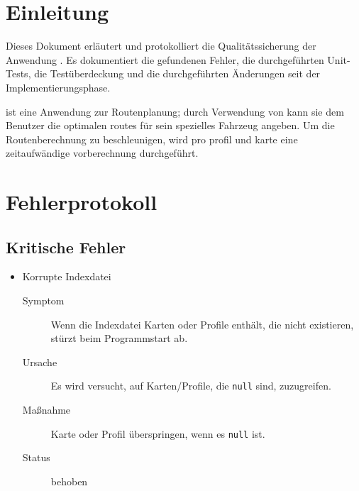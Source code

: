 \documentclass[a4paper, 11pt]{article}
\makeatletter
\def\namedlabel#1#2{\begingroup
    #2%
    \def\@currentlabel{#2}%
    \phantomsection\label{#1}\endgroup
}
\newcommand{\oitem}[2]{
  \@ifundefined{c@oitem#1}{\newcounter{oitem#1}}{} %
  \addtocounter{oitem#1}{10}
  \item[\namedlabel{#1:#2}{/#1\arabic{oitem#1}/}]
}
\newcommand{\bug}[6]{%
  \oitem{BG}{#1}
  	#2
    \begin{description}
    \item[Symptom] #3
    \item[Ursache] #4
    \item[Maßnahme] #5
    \item[Status] #6
    \end{description}
}
\newcommand{\code}[1]{\texttt{#1}}
\makeatother
\begin{document}
\section{Einleitung}
Dieses Dokument erläutert und protokolliert die Qualitätssicherung der Anwendung \routeKIT. Es dokumentiert die gefundenen Fehler, die durchgeführten Unit-Tests, die Testüberdeckung und die durchgeführten Änderungen seit der Implementierungsphase.

\routeKIT ist eine Anwendung zur Routenplanung; durch Verwendung von  kann sie dem Benutzer die optimalen \glspl{route} für sein spezielles Fahrzeug angeben.
Um die Routenberechnung zu beschleunigen, wird pro \gls{profil} und \gls{karte} eine zeitaufwändige \gls{vorberechnung} durchgeführt.

\section{Fehlerprotokoll}

\subsection{Kritische Fehler}
\begin{itemize}
\bug{corruptIndex}{Korrupte Indexdatei}
    {Wenn die Indexdatei Karten oder Profile enthält, die nicht existieren, stürzt \routeKIT beim Programmstart ab.}
    {Es wird versucht, auf Karten/Profile, die \code{null} sind, zuzugreifen.}
    {Karte oder Profil überspringen, wenn es \code{null} ist.}
    {behoben}
\end{itemize}
\end{document}
